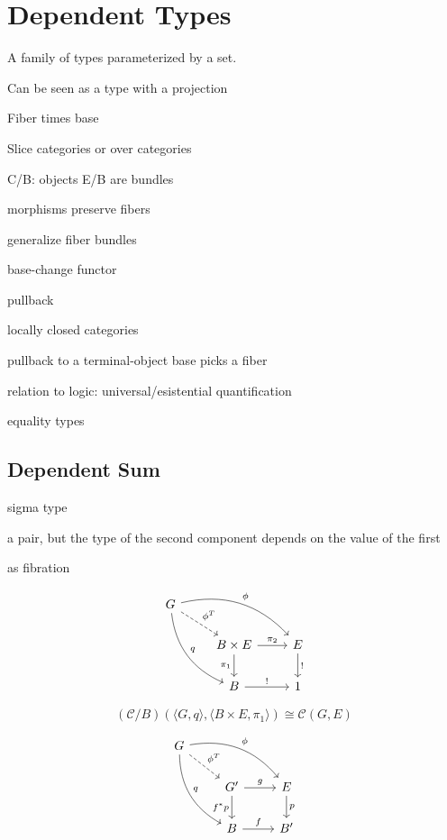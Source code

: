 \documentclass[DaoFP]{subfiles}
\begin{document}
\setcounter{chapter}{10}

\chapter{Dependent Types}

A family of types parameterized by a set.

Can be seen as a type with a projection

Fiber times base

Slice categories or over categories

C/B: objects E/B are bundles

morphisms preserve fibers

generalize fiber bundles

base-change functor

pullback 


locally closed categories

pullback to a terminal-object base picks a fiber

relation to logic: universal/esistential quantification

equality types

\section{Dependent Sum}

sigma type

a pair, but the type of the second component depends on the value of the first

as fibration 

\[
 \begin{tikzcd}
 G
 \arrow[dr, dashed, "\phi^T"]
 \arrow[drr, bend left, "\phi"]
 \arrow[ddr, bend right, "q"]
 \\
 &B \times E
 \arrow[r, "\pi_2"]
 \arrow[d, "\pi_1"']
 &E
 \arrow[d, "!"]
 \\
 &B
 \arrow[r, "!"]
 &1
  \end{tikzcd}
\]

\[(\mathcal{C}/B)(\langle G, q \rangle, \langle B \times E, \pi_1 \rangle) \cong \mathcal{C}(G, E) \]

\[
 \begin{tikzcd}
 G
 \arrow[dr, dashed, "\phi^T"]
 \arrow[drr, bend left, "\phi"]
 \arrow[ddr, bend right, "q"]
 \\
 &G'
 \arrow[r, "g"]
 \arrow[d, "f^* p"']
 &E
 \arrow[d, "p"]
 \\
 &B
 \arrow[r, "f"]
 &B'
  \end{tikzcd}
\]
\end{document}

